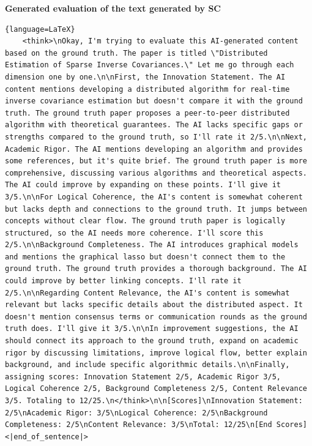 \textbf{Generated evaluation of the text generated by SC}
\begin{lstlisting}{language=LaTeX}
    <think>\nOkay, I'm trying to evaluate this AI-generated content based on the ground truth. The paper is titled \"Distributed Estimation of Sparse Inverse Covariances.\" Let me go through each dimension one by one.\n\nFirst, the Innovation Statement. The AI content mentions developing a distributed algorithm for real-time inverse covariance estimation but doesn't compare it with the ground truth. The ground truth paper proposes a peer-to-peer distributed algorithm with theoretical guarantees. The AI lacks specific gaps or strengths compared to the ground truth, so I'll rate it 2/5.\n\nNext, Academic Rigor. The AI mentions developing an algorithm and provides some references, but it's quite brief. The ground truth paper is more comprehensive, discussing various algorithms and theoretical aspects. The AI could improve by expanding on these points. I'll give it 3/5.\n\nFor Logical Coherence, the AI's content is somewhat coherent but lacks depth and connections to the ground truth. It jumps between concepts without clear flow. The ground truth paper is logically structured, so the AI needs more coherence. I'll score this 2/5.\n\nBackground Completeness. The AI introduces graphical models and mentions the graphical lasso but doesn't connect them to the ground truth. The ground truth provides a thorough background. The AI could improve by better linking concepts. I'll rate it 2/5.\n\nRegarding Content Relevance, the AI's content is somewhat relevant but lacks specific details about the distributed aspect. It doesn't mention consensus terms or communication rounds as the ground truth does. I'll give it 3/5.\n\nIn improvement suggestions, the AI should connect its approach to the ground truth, expand on academic rigor by discussing limitations, improve logical flow, better explain background, and include specific algorithmic details.\n\nFinally, assigning scores: Innovation Statement 2/5, Academic Rigor 3/5, Logical Coherence 2/5, Background Completeness 2/5, Content Relevance 3/5. Totaling to 12/25.\n</think>\n\n[Scores]\nInnovation Statement: 2/5\nAcademic Rigor: 3/5\nLogical Coherence: 2/5\nBackground Completeness: 2/5\nContent Relevance: 3/5\nTotal: 12/25\n[End Scores]<|end_of_sentence|>
\end{lstlisting}

